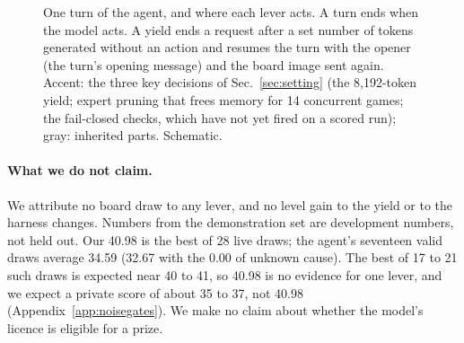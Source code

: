 \begin{figure}[t]
\centering
{}
\caption{One turn of the agent, and where each lever acts. A turn ends when the model acts. A yield ends a request after a set number of tokens generated without an action and resumes the turn with the opener (the turn's opening message) and the board image sent again. Accent: the three key decisions of Sec.~\ref{sec:setting} (the 8,192-token yield; expert pruning that frees memory for 14 concurrent games; the fail-closed checks, which have not yet fired on a scored run); gray: inherited parts. Schematic.}\label{fig:loop} %
\end{figure}

\paragraph{What we do not claim.}
We attribute no board draw to any lever, and no level gain to the yield or to the harness changes.
Numbers from the demonstration set are development numbers, not held out.
Our 40.98 is the best of 28 live draws; the agent's seventeen valid draws average 34.59 (32.67 with the 0.00 of unknown cause). The best of 17 to 21 such draws is expected near 40 to 41, so 40.98 is no evidence for one lever, and we expect a private score of about 35 to 37, not 40.98 (Appendix~\ref{app:noisegates}). %
We make no claim about whether the model's licence is eligible for a prize. %

